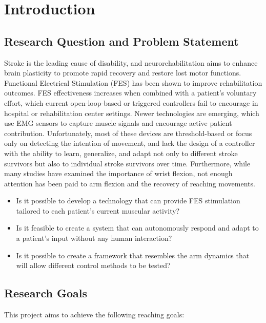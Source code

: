 \chapter{Introduction}
\section{Research Question and Problem Statement}

Stroke is the leading cause of disability, and neurorehabilitation aims to enhance brain plasticity to promote rapid recovery and restore lost motor functions. Functional Electrical Stimulation (FES) has been shown to improve rehabilitation outcomes. FES effectiveness increases when combined with a patient's voluntary effort, which current open-loop-based or triggered controllers fail to encourage in hospital or rehabilitation center settings. Newer technologies are emerging, which use EMG sensors to capture muscle signals and encourage active patient contribution. Unfortunately, most of these devices are threshold-based or focus only on detecting the intention of movement, and lack the design of a controller with the ability to learn, generalize, and adapt not only to different stroke survivors but also to individual stroke survivors over time. Furthermore, while many studies have examined the importance of wrist flexion, not enough attention has been paid to arm flexion and the recovery of reaching movements.

\begin{itemize}
    \item Is it possible to develop a technology that can provide FES stimulation tailored to each patient's current muscular activity?
    \item Is it feasible to create a system that can autonomously respond and adapt to a patient's input without any human interaction?
    \item Is it possible to create a framework that resembles the arm dynamics that will allow different control methods to be tested?
\end{itemize}

\section{Research Goals}


This project aims to achieve the following reaching goals:

